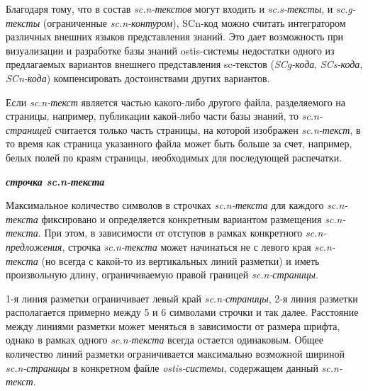 Благодаря тому, что в состав \textit{sc.n-текстов} могут входить и \textit{sc.s-тексты}, и \textit{sc.g-тексты} (ограниченные \textit{sc.n-контуром}), SCn-код можно считать интегратором различных внешних языков представления знаний.  Это дает возможность при визуализации и разработке базы знаний ostis-системы недостатки одного из предлагаемых вариантов внешнего представления sc-текстов (\textit{SCg-кода}, \textit{SCs-кода}, \textit{SCn-кода}) компенсировать достоинствами других вариантов.

\begin{SCn}
\end{SCn}

Если \textit{sc.n-текст} является частью какого-либо другого файла, разделяемого на страницы, например, публикации какой-либо части базы знаний, то \textit{sc.n-страницей} считается только часть страницы, на которой изображен \textit{sc.n-текст}, в то время как страница указанного файла может быть больше за счет, например, белых полей по краям страницы, необходимых для последующей распечатки.

\textbf{\textit{строчка sc.n-текста}}

Максимальное количество символов в строчках \textit{sc.n-текста} для каждого \textit{sc.n-текста} фиксировано и определяется конкретным вариантом размещения \textit{sc.n-текста}. При этом, в зависимости от отступов в рамках конкретного \textit{sc.n-предложения}, строчка \textit{sc.n-текста} может начинаться не с левого края \textit{sc.n-текста} (но всегда с какой-то из вертикальных линий разметки) и иметь произвольную длину, ограничиваемую правой границей \textit{sc.n-страницы}.

\begin{SCn}
\end{SCn}

1-я линия разметки ограничивает левый край \textit{sc.n-страницы}, 2-я линия разметки располагается примерно между 5 и 6 символами строчки и так далее. Расстояние между линиями разметки может меняться в зависимости от размера шрифта, однако в рамках одного \textit{sc.n-текста} всегда остается одинаковым. Общее количество линий разметки ограничивается максимально возможной шириной \textit{sc.n-страницы} в конкретном файле \textit{ostis-системы}, содержащем данный \textit{sc.n-текст}.


